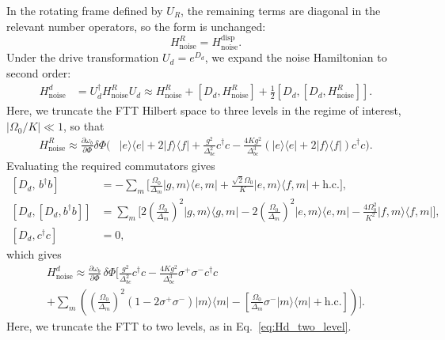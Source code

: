 In the rotating frame defined by $U_R$, the remaining terms are diagonal in the relevant number operators, so the form is unchanged:
\begin{equation}
    H_{\mathrm{noise}}^R = H_{\mathrm{noise}}^{\mathrm{disp}}.
\end{equation}
Under the drive transformation $U_d = e^{D_d}$, we expand the noise Hamiltonian to second order:
\begin{align}
    H_{\mathrm{noise}}^d &= U_d^\dagger H_{\mathrm{noise}}^R U_d \nonumber \approx H_{\mathrm{noise}}^R + [D_d, H_{\mathrm{noise}}^R] + \frac{1}{2} [D_d, [D_d, H_{\mathrm{noise}}^R]].
\end{align}
Here, we truncate the FTT Hilbert space to three levels in the regime of interest, $|\Omega_0/K| \ll 1$, so that
\begin{equation}
\begin{split}
    H_{\mathrm{noise}}^R \approx \frac{\partial \omega_b}{\partial \Phi} \delta \Phi \bigg( & |e\rangle\langle e| + 2|f\rangle\langle f| + \frac{g^2}{\Delta_{bc}^2} c^\dagger c- \frac{4Kg^2}{\Delta_{bc}^3} \left( |e\rangle\langle e| + 2|f\rangle\langle f| \right) c^\dagger c \bigg).
\end{split}
\end{equation}
Evaluating the required commutators gives
\begin{align}
    \left[ D_d, \, b^\dagger b \right] &= -\sum_m \bigg[ \frac{\Omega_0}{\Delta_m} |g,m\rangle \langle e,m| + \frac{\sqrt{2}\Omega_0}{K} |e,m\rangle \langle f,m| + \text{h.c.} \bigg], \nonumber \\
    \left[ D_d, \left[ D_d, b^\dagger b \right] \right] &= \sum_m \Bigg[ 2 \left( \frac{\Omega_0}{\Delta_m} \right)^2 |g,m\rangle\langle g,m| - 2 \left( \frac{\Omega_0}{\Delta_m} \right)^2 |e,m\rangle\langle e,m| \nonumber - \frac{4\Omega_0^2}{K^2} |f,m\rangle\langle f,m| \Bigg], \nonumber \\
    [D_d, c^\dagger c] &= 0,
\end{align}
which gives
\begin{multline}
\label{eq:noise_Hamiltoniand}
H_{\mathrm{noise}}^d \approx \frac{\partial \omega_b}{\partial \Phi}\,\delta \Phi \Bigg[
\frac{g^2}{\Delta_{bc}^2} c^\dagger c
- \frac{4Kg^2}{\Delta_{bc}^3}\sigma^+\sigma^- c^\dagger c \\
+ \sum_m \left(
\left(\frac{\Omega_0}{\Delta_m}\right)^2 (1-2\sigma^+\sigma^-)|m\rangle\langle m|
- \left[ \frac{\Omega_0}{\Delta_m}\sigma^- |m\rangle\langle m| + \text{h.c.} \right]
\right)\Bigg].
\end{multline}
Here, we truncate the FTT to two levels, as in Eq.~\eqref{eq:Hd_two_level}.

